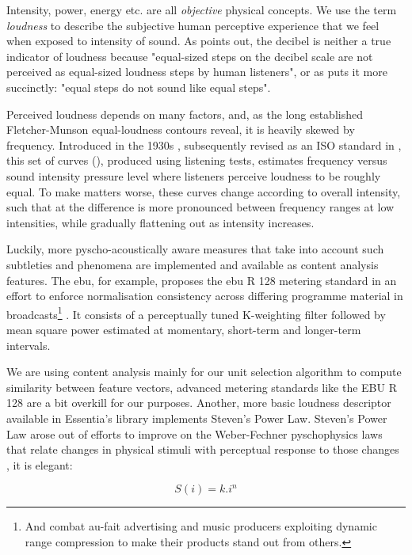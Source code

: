 {{Intensity, power, energy etc. are all \textit{objective} physical concepts. We use the term \textit{loudness} to describe the subjective human perceptive experience that we feel when exposed to intensity of sound. As \cite{Lerch2012} points out, the decibel is neither a true indicator of loudness because "equal-sized steps on the decibel scale are not perceived as equal-sized loudness steps by human listeners", or as \cite{Stevens1955} puts it more succinctly: "equal steps do not sound like equal steps".

Perceived loudness depends on many factors, and, as the long established  Fletcher-Munson equal-loudness contours reveal, it is heavily skewed by frequency. Introduced in the 1930s \citep{Fletcher1933}, subsequently revised as an ISO standard in \cite{countours}, this set of curves (), produced using listening tests, estimates frequency versus sound intensity pressure level where listeners perceive loudness to be roughly equal. To make matters worse, these curves change according to overall intensity, such that at  the difference is more pronounced between frequency ranges at low intensities, while gradually flattening out as intensity increases.

Luckily, more pyscho-acoustically aware measures that take into account such subtleties and phenomena are implemented and available as content analysis features. The \acrfull{ebu}, for example, proposes the \acrshort{ebu} R 128 metering standard in an effort to enforce normalisation consistency across differing programme material in broadcasts\footnote{And combat au-fait advertising and music producers exploiting dynamic range compression to make their products stand out from others.} \citep{ebu, Lerch2012}. It consists of a perceptually tuned K-weighting filter followed by mean square power estimated at momentary, short-term and longer-term intervals.

We are using content analysis mainly for our unit selection algorithm to compute similarity between feature vectors, advanced metering standards like the EBU R 128 are a bit overkill for our purposes. Another, more basic loudness descriptor available in Essentia's library implements Steven's Power Law. Steven's Power Law arose out of efforts to improve on the Weber-Fechner pyschophysics laws that relate changes in physical stimuli with perceptual response to those changes \citep{Stevens1975, Reiss2001}, it is elegant:

\begin{equation}
\label{eq:stevens}
S(i)=k.i^{n}
\end{equation}

}}
